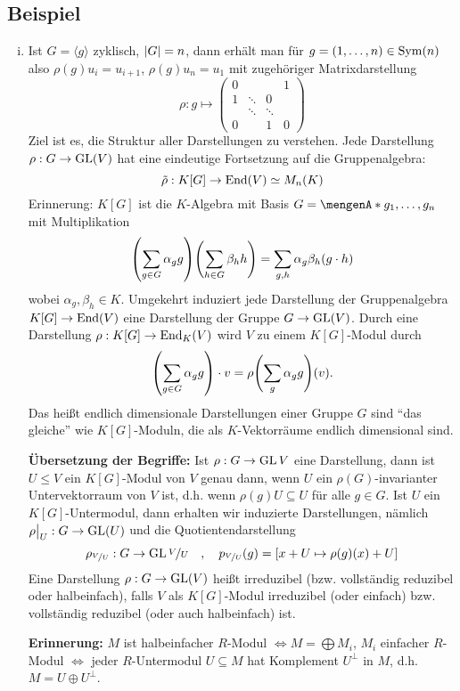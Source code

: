 \subsection{Beispiel} %
\label{sub:42}
\begin{enumerate}[(i)]
	\item Ist $G= \langle g \rangle$ zyklisch, $\abs*{G}=n$, dann erhält man für $g=(1, \ldots ,n) \in \Sym(n)$ also $\rho(g)u_i = u_{i+1}$, $\rho(g)u_n= u_1$ mit
	zugehöriger Matrixdarstellung 
	\[
		\rho : g \longmapsto \begin{pmatrix}
			0 & & & 1 \\
			1 & \ddots & 0 & \\
			 & \ddots & \ddots &\\
			 0 & & 1 & 0
		\end{pmatrix}
	\]
	Ziel ist es, die Struktur aller Darstellungen zu verstehen. Jede Darstellung $\rho : G \to \GL(V)$ hat eine eindeutige Fortsetzung auf die Gruppenalgebra:
	\[
		\tilde{\rho} : K[G] \to \End(V) \simeq M_n(K)
	\]
	Erinnerung: $K[G]$ ist die $K$-Algebra mit Basis $G = \set{g_1, \ldots, g_n}$ mit Multiplikation 
	\[
		\enbrace*{\sum_{g \in G} \alpha_g g} \enbrace*{\sum_{h \in G} \beta_h h} = \sum_{g,h} \alpha_g \beta_h (g \cdot h)
	\]
	wobei $\alpha_g, \beta_h \in K$. Umgekehrt induziert jede Darstellung der Gruppenalgebra $K[G] \to \End(V)$ eine Darstellung der Gruppe $G \to \GL(V)$. Durch eine
	Darstellung $\rho : K[G] \to \End_K(V)$ wird $V$ zu einem $K[G]$-Modul durch 
	\[
		\enbrace*{\sum_{g \in G} \alpha_g g} \cdot v= \rho \enbrace*{\sum_g \alpha_g g}(v).
	\]
	Das heißt endlich dimensionale Darstellungen einer Gruppe $G$ sind \enquote{das gleiche} wie $K[G]$-Moduln, die als $K$-Vektorräume endlich dimensional sind.
	
	
	\textbf{Übersetzung der Begriffe:} Ist $\rho : G \to \GL{V}$ eine Darstellung, dann ist $U \le V$ ein $K[G]$-Modul von $V$ genau dann, wenn $U$ ein $\rho(G)$-invarianter
	Untervektorraum von $V$ ist, d.h. wenn $\rho(g)U \subseteq U$ für alle $g \in G$. Ist $U$ ein $K[G]$-Untermodul, dann erhalten wir induzierte Darstellungen, nämlich 
	$\rho\big|_{U} : G \to \GL(U)$ und die Quotientendarstellung 
	\[
		\rho_{\nicefrac{V}{U}} : G \to \GL{\nicefrac{V}{U}} \quad ,\quad p_{\nicefrac{V}{U}} (g) = \benbrace*{x+ U \mapsto \rho(g)(x)+U}
	\]
	Eine Darstellung $\rho : G \to \GL(V)$ heißt irreduzibel (bzw. vollständig reduzibel oder halbeinfach), falls $V$ als $K[G]$-Modul irreduzibel (oder einfach) bzw.
	vollständig reduzibel (oder auch halbeinfach) ist. 
	
	\textbf{Erinnerung:} $M$ ist halbeinfacher $R$-Modul $\iff M= \bigoplus M_i$, $M_i$ einfacher $R$-Modul $\iff$ jeder $R$-Untermodul $U \subseteq M$ hat Komplement
	$U^\bot$ in $M$, d.h. $M= U \oplus U^\bot$.
\end{enumerate}

